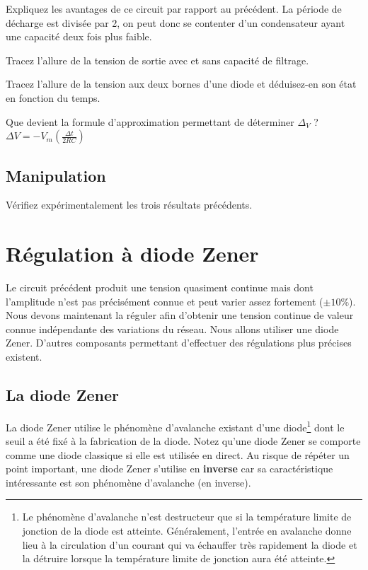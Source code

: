 \documentclass{../template/labo}
\begin{document}
\Question
{
	Expliquez les avantages de ce circuit par rapport au précédent.
}
{
La période de décharge est divisée par 2, on peut donc se contenter d'un condensateur ayant une capacité deux fois plus faible.
}%
	\label{Q:17}

\Question
{
	Tracez l'allure de la tension de sortie avec et sans capacité de filtrage.
}
{}%
	\label{Q:18}

\Question
{
	Tracez l'allure de la tension aux deux bornes d'une diode et déduisez-en son état en fonction du temps.
}
{}%
	\label{Q:19}


\Question
{
	Que devient la formule d'approximation permettant de déterminer $\Delta_V$ ? 
}
{
$\Delta V = - V_m (\frac{\Delta t}{2RC})$
}%
	\label{Q:20}


\subsection{Manipulation}
\Question
{
	Vérifiez expérimentalement les trois résultats précédents.
}
{}%
	\label{Q:21}


\section{Régulation à diode Zener}
Le circuit précédent produit une tension quasiment continue mais dont l'amplitude n'est pas précisément connue et peut varier assez fortement ($\pm 10\%$). Nous devons maintenant la réguler afin d'obtenir une tension continue de valeur connue indépendante des variations du réseau. Nous allons utiliser une diode Zener. D'autres composants permettant d'effectuer des régulations plus précises existent.

\subsection{La diode Zener}%

La diode Zener utilise le phénomène d'avalanche existant d'une diode\footnote{Le phénomène d'avalanche n'est destructeur que si la température limite de jonction de la diode est atteinte. Généralement, l'entrée en avalanche donne lieu à la circulation d'un courant qui va échauffer très rapidement la diode et la détruire lorsque la température limite de jonction aura été atteinte.} dont le seuil a été fixé à la fabrication de la diode. Notez qu'une diode Zener  se comporte comme une diode classique si elle est utilisée en direct. Au risque de répéter un point important, une diode Zener s'utilise en \textbf{inverse} car sa caractéristique intéressante est son phénomène d'avalanche (en inverse).
\end{document}
